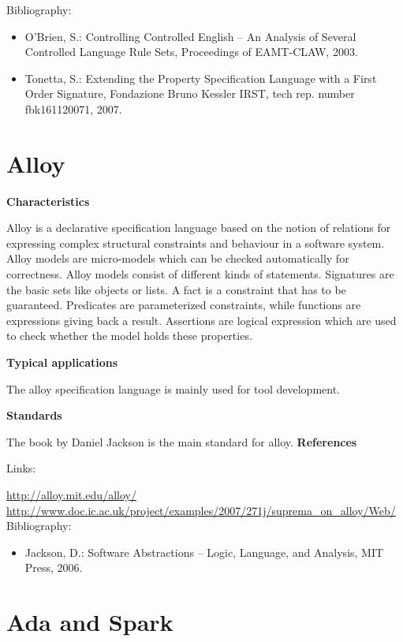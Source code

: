 \documentclass{./template/openetcs_report}
\begin{document}
Bibliography:

\begin{itemize}
\item O'Brien, S.: Controlling Controlled English -- An Analysis of Several Controlled Language Rule Sets, Proceedings of EAMT-CLAW, 2003.
\item Tonetta, S.: Extending the Property Specification Language with a First Order Signature, Fondazione Bruno Kessler IRST, tech rep. number fbk161120071, 2007.
\end{itemize}

\section{Alloy}


	\textbf{Characteristics}

Alloy is a declarative specification language based on the notion of relations for expressing complex structural constraints and behaviour in a software system. Alloy models are micro-models which can be checked automatically for correctness. 
Alloy models consist of different kinds of statements. Signatures are the basic sets like objects or lists. A fact is a constraint that has to be guaranteed. Predicates are parameterized constraints, while functions are expressions giving back a result. Assertions are logical expression which are used to check whether the model holds these properties.

	\textbf{Typical applications}

The alloy specification language is mainly used for tool development.

	\textbf{Standards}

The book by Daniel Jackson is the main standard for alloy.
	\textbf{References}

Links:

\url{http://alloy.mit.edu/alloy/} \\[4pt]
\url{http://www.doc.ic.ac.uk/project/examples/2007/271j/suprema_on_alloy/Web/} \\[4pt]

Bibliography:

\begin{itemize}
\item Jackson, D.: Software Abstractions -- Logic, Language, and Analysis, MIT Press, 2006. 
\end{itemize}

\section{Ada and Spark}
\end{document}
